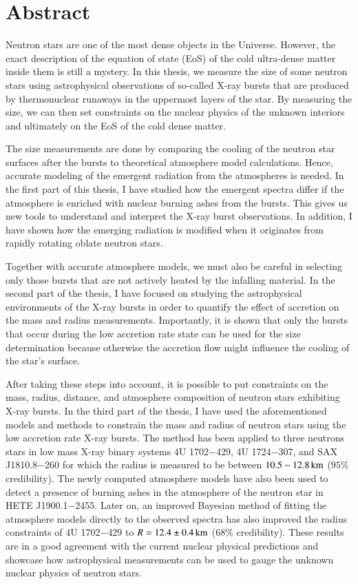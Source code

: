 \chapter*{Abstract}

Neutron stars are one of the most dense objects in the Universe.
However, the exact description of the equation of state (EoS) of the cold ultra-dense matter inside them is still a mystery.
In this thesis, we measure the size of some neutron stars using astrophysical observations of so-called X-ray bursts that are produced by thermonuclear runaways in the uppermost layers of the star.
By measuring the size, we can then set constraints on the nuclear physics of the unknown interiors and ultimately on the EoS of the cold dense matter.

The size measurements are done by comparing the cooling of the neutron star surfaces after the bursts to theoretical atmosphere model calculations.
Hence, accurate modeling of the emergent radiation from the atmospheres is needed.
In the first part of this thesis, I have studied how the emergent spectra differ if the atmosphere is enriched with nuclear burning ashes from the bursts.
This gives us new tools to understand and interpret the X-ray burst observations.
In addition, I have shown how the emerging radiation is modified when it originates from rapidly rotating oblate neutron stars.

Together with accurate atmosphere models, we must also be careful in selecting only those bursts that are not actively heated by the infalling material.
In the second part of the thesis, I have focused on studying the astrophysical environments of the X-ray bursts in order to quantify the effect of accretion on the mass and radius measurements.
Importantly, it is shown that only the bursts that occur during the low accretion rate state can be used for the size determination because otherwise the accretion flow might influence the cooling of the star's surface.

After taking these steps into account, it is possible to put constraints on the mass, radius, distance, and atmosphere composition of neutron stars exhibiting X-ray bursts.
In the third part of the thesis, I have used the aforementioned models and methods to constrain the mass and radius of neutron stars using the low accretion rate X-ray bursts.
The method has been applied to three neutrons stars in low mass X-ray binary systems 4U 1702$-$429, 4U 1724$-$307, and SAX J1810.8$-$260 for which the radius is measured to be between $10.5 - 12.8\, \mathrm{km}$ ($95$\% credibility).
The newly computed atmosphere models have also been used to detect a presence of burning ashes in the atmosphere of the neutron star in HETE J1900.1$-$2455.
Later on, an improved Bayesian method of fitting the atmosphere models directly to the observed spectra has also improved the radius constraints of 4U 1702$-$429 to $R = 12.4 \pm 0.4\, \mathrm{km}$ ($68\%$ credibility). 
These results are in a good agreement with the current nuclear physical predictions and showcase how astrophysical measurements can be used to gauge the unknown nuclear physics of neutron stars.

